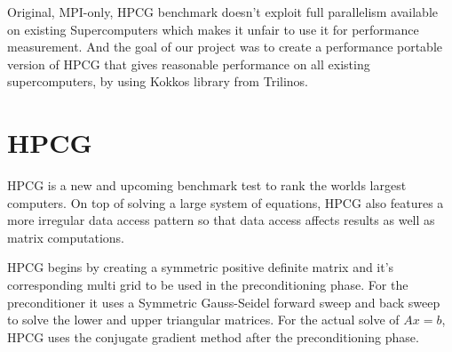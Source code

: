 \documentclass{ccr15}
\begin{document}
Original, MPI-only,  HPCG benchmark doesn't exploit full parallelism available on existing Supercomputers which makes it unfair to use it for performance measurement.
And the goal of our project was to create a performance portable version of HPCG that gives reasonable performance on all existing supercomputers, by using Kokkos library from Trilinos.


\section{HPCG}
HPCG is a new and
upcoming benchmark test to rank the worlds largest computers. On top
of solving a large system of equations, HPCG also features a more irregular data access pattern
so that data access affects results as well as matrix computations.

HPCG begins by creating a symmetric positive definite matrix and it's corresponding multi grid 
to be used in the preconditioning phase. For the preconditioner it uses a Symmetric Gauss-Seidel 
forward sweep and back sweep to solve the lower and upper triangular matrices. For the actual
solve of $A x = b$, HPCG uses the conjugate gradient method after the preconditioning phase.
\end{document}
